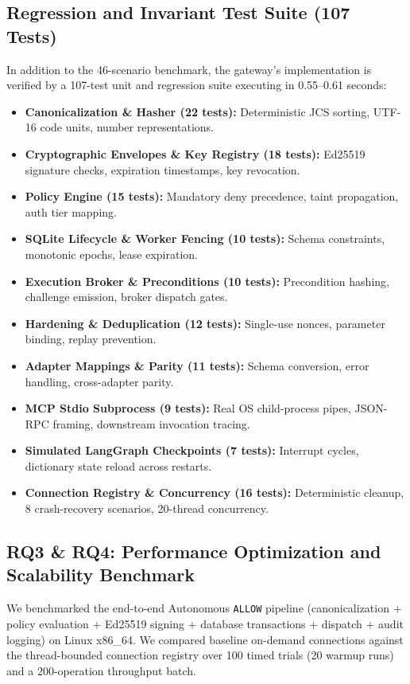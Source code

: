 \documentclass[sigconf,anonymous,review]{acmart}
\begin{document}
\subsection{Regression and Invariant Test Suite (107 Tests)}
In addition to the 46-scenario benchmark, the gateway's implementation is verified by a 107-test unit and regression suite executing in 0.55--0.61 seconds:
\begin{itemize}
    \item \textbf{Canonicalization \& Hasher (22 tests):} Deterministic JCS sorting, UTF-16 code units, number representations.
    \item \textbf{Cryptographic Envelopes \& Key Registry (18 tests):} Ed25519 signature checks, expiration timestamps, key revocation.
    \item \textbf{Policy Engine (15 tests):} Mandatory deny precedence, taint propagation, auth tier mapping.
    \item \textbf{SQLite Lifecycle \& Worker Fencing (10 tests):} Schema constraints, monotonic epochs, lease expiration.
    \item \textbf{Execution Broker \& Preconditions (10 tests):} Precondition hashing, challenge emission, broker dispatch gates.
    \item \textbf{Hardening \& Deduplication (12 tests):} Single-use nonces, parameter binding, replay prevention.
    \item \textbf{Adapter Mappings \& Parity (11 tests):} Schema conversion, error handling, cross-adapter parity.
    \item \textbf{MCP Stdio Subprocess (9 tests):} Real OS child-process pipes, JSON-RPC framing, downstream invocation tracing.
    \item \textbf{Simulated LangGraph Checkpoints (7 tests):} Interrupt cycles, dictionary state reload across restarts.
    \item \textbf{Connection Registry \& Concurrency (16 tests):} Deterministic cleanup, 8 crash-recovery scenarios, 20-thread concurrency.
\end{itemize}

\subsection{RQ3 \& RQ4: Performance Optimization and Scalability Benchmark}
We benchmarked the end-to-end Autonomous \texttt{ALLOW} pipeline (canonicalization + policy evaluation + Ed25519 signing + database transactions + dispatch + audit logging) on Linux x86\_64. We compared baseline on-demand connections against the thread-bounded connection registry over 100 timed trials (20 warmup runs) and a 200-operation throughput batch.
\end{document}
